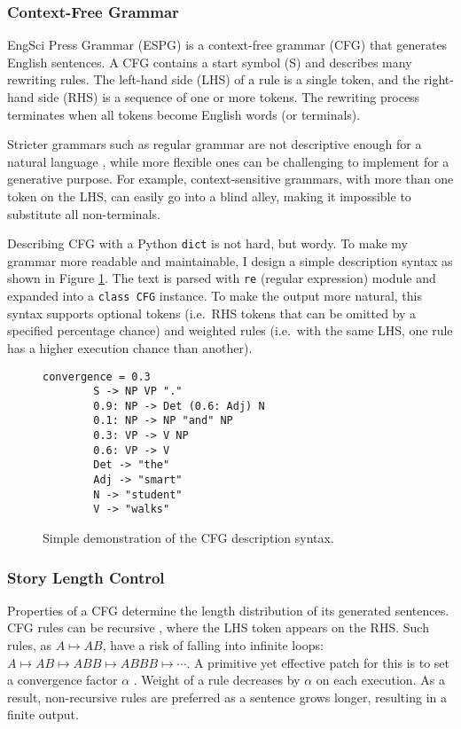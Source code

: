 \documentclass[../main.tex]{subfiles}
\begin{document}
\subsubsection{Context-Free Grammar}

EngSci Press Grammar (ESPG) is a context-free grammar (CFG) \cite{bib:context_free_grammar} that generates English sentences. A CFG contains a start symbol (S) and describes many rewriting rules. The left-hand side (LHS) of a rule is a single token, and the right-hand side (RHS) is a sequence of one or more tokens. The rewriting process terminates when all tokens become English words (or terminals).

Stricter grammars such as regular grammar are not descriptive enough for a natural language \cite{bib:regular_grammar}, while more flexible ones can be challenging to implement for a generative purpose. For example, context-sensitive grammars, with more than one token on the LHS, can easily go into a blind alley, making it impossible to substitute all non-terminals.

Describing CFG with a Python \texttt{dict} is not hard, but wordy. To make my grammar more readable and maintainable, I design a simple description syntax as shown in Figure \ref{fig:cfg_description_syntax}. The text is parsed with \texttt{re} (regular expression) module and expanded into a \texttt{class CFG} instance. To make the output more natural, this syntax supports optional tokens (i.e.\ RHS tokens that can be omitted by a specified percentage chance) and weighted rules (i.e.\ with the same LHS, one rule has a higher execution chance than another).

\begin{figure}
	\centering
	\begin{lstlisting}[gobble=4]
		convergence = 0.3
		S -> NP VP "."
		0.9: NP -> Det (0.6: Adj) N
		0.1: NP -> NP "and" NP
		0.3: VP -> V NP
		0.6: VP -> V
		Det -> "the"
		Adj -> "smart"
		N -> "student"
		V -> "walks"
	\end{lstlisting}
	\vspace{-0.15in}
	\caption{Simple demonstration of the CFG description syntax.}
	\label{fig:cfg_description_syntax}
\end{figure}

\subsubsection{Story Length Control}

Properties of a CFG determine the length distribution of its generated sentences. CFG rules can be recursive \cite{bib:recursive_grammar}, where the LHS token appears on the RHS. Such rules, as $A \mapsto A B$, have a risk of falling into infinite loops: $A \mapsto A B \mapsto A B B \mapsto A B B B \mapsto \cdots$. A primitive yet effective patch for this is to set a convergence factor $\alpha$ \cite{bib:convergence_factor}. Weight of a rule decreases by $\alpha$ on each execution. As a result, non-recursive rules are preferred as a sentence grows longer, resulting in a finite output.
\end{document}
